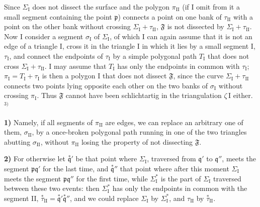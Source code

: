 \documentclass{article}
\begin{document}
Since $\varSigma_{\mathrm{I}}$ does not dissect the surface and the polygon $\pi_{\mathrm{II}}$ (if I omit from it a small segment containing the point $\mathfrak{p}$) connects a point on one bank of $\tau_{\mathrm{II}}$ with a point on the other bank without crossing $\varSigma_{\mathrm{I}} + \tau_{\mathrm{II}}$, $\mathfrak{F}$ is not dissected by $\varSigma_{\mathrm{I}} + \tau_{\mathrm{II}}$. Now I consider a segment $\sigma_{\mathrm{I}}$ of $\varSigma_{\mathrm{I}}$, of which I can again assume that it is not an edge of a triangle I, cross it in the triangle I in which it lies by a small segment I, $\tau_{\mathrm{I}}$, and connect the endpoints of $\tau_{\mathrm{I}}$ by a simple polygonal path $T_{\mathrm{I}}$ that does not cross $\varSigma_{\mathrm{I}} + \tau_{\mathrm{II}}$. I may assume that $T_{\mathrm{I}}$ has only the endpoints in common with $\tau_{\mathrm{I}}$; $\pi_{\mathrm{I}} = T_{\mathrm{I}} + \tau_{\mathrm{I}}$ is then a polygon I that does not dissect $\mathfrak{F}$, since the curve $\varSigma_{\mathrm{I}} + \tau_{\mathrm{II}}$ connects two points lying opposite each other on the two banks of $\sigma_{\mathrm{I}}$ without crossing $\pi_{\mathrm{I}}$. Thus $\mathfrak{F}$ cannot have been schlichtartig in the triangulation $\zeta\,\mathrm{I}$ either.${}^{3)}$

\textbf{1)} Namely, if all segments of $\pi_{\mathrm{II}}$ are edges, we can replace an arbitrary one of them, $\sigma_{\mathrm{II}}$, by a once-broken polygonal path running in one of the two triangles abutting $\sigma_{\mathrm{II}}$, without $\pi_{\mathrm{II}}$ losing the property of not dissecting $\mathfrak{F}$.

\textbf{2)} For otherwise let $\overset{*}{\mathfrak{q}}'$ be that point where $\varSigma_{\mathrm{I}}$, traversed from $\mathfrak{q}'$ to $\mathfrak{q}''$, meets the segment $\mathfrak{p}\mathfrak{q}'$ for the last time, and $\overset{*}{\mathfrak{q}}''$ that point where after this moment $\varSigma_{\mathrm{I}}$ meets the segment $\mathfrak{p}\mathfrak{q}''$ for the first time, while $\varSigma_{\mathrm{I}}^*$ is the part of $\varSigma_{\mathrm{I}}$ traversed between these two events: then $\varSigma_{\mathrm{I}}^*$ has only the endpoints in common with the segment II, $\overset{*}{\tau}_{\mathrm{II}} = \overset{*}{\mathfrak{q}}'\overset{*}{\mathfrak{q}}''$, and we could replace $\varSigma_{\mathrm{I}}$ by $\varSigma_{\mathrm{I}}^*$, and $\tau_{\mathrm{II}}$ by $\overset{*}{\tau}_{\mathrm{II}}$.
\end{document}
